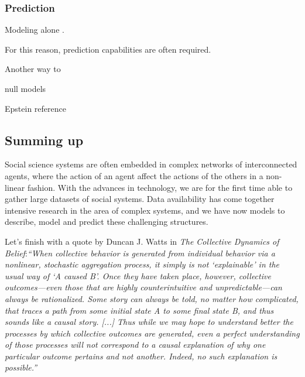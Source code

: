 \subsubsection{Prediction}
Modeling alone . 

For this reason, prediction capabilities are often required.

Another way to 

null models

Epstein reference

\subsection{Summing up}
Social science systems are often embedded in complex networks of interconnected agents, 
where the action of an agent affect the actions of the others in a non-linear fashion.
With the advances in technology, 
we are for the first time able to gather large datasets of social systems.
Data availability has come together intensive research in the area of complex systems,
and we have now models to describe, model and predict these challenging structures.

Let's finish with a quote by Duncan J. Watts in \textit{The Collective Dynamics of Belief}:\textit{``When collective behavior is generated from individual behavior via a nonlinear, stochastic aggregation process, it simply is not `explainable' in the usual way of `A caused B'. Once they have taken place, however, collective outcomes—even those that are highly counterintuitive and unpredictable—can always be rationalized. Some story can always be told, no matter how complicated, that traces a path from some initial state A to some final state B, and thus sounds like a causal story.
[...]
Thus while we may hope to understand better the processes by which collective outcomes are generated, even a perfect understanding of those processes will not correspond to a causal explanation of why one particular outcome pertains and not another. Indeed, no such explanation is possible.''}



